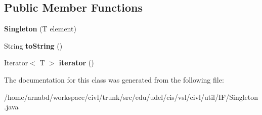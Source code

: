 \subsection*{Public Member Functions}
\begin{DoxyCompactItemize}
\item 
\hypertarget{classedu_1_1udel_1_1cis_1_1vsl_1_1civl_1_1util_1_1IF_1_1Singleton_a96b16dc1d5abe61f7f0a68994936ddb7}{}{\bfseries Singleton} (T element)\label{classedu_1_1udel_1_1cis_1_1vsl_1_1civl_1_1util_1_1IF_1_1Singleton_a96b16dc1d5abe61f7f0a68994936ddb7}

\item 
\hypertarget{classedu_1_1udel_1_1cis_1_1vsl_1_1civl_1_1util_1_1IF_1_1Singleton_ad26eefbdc586449d96727ef1938c15a4}{}String {\bfseries to\+String} ()\label{classedu_1_1udel_1_1cis_1_1vsl_1_1civl_1_1util_1_1IF_1_1Singleton_ad26eefbdc586449d96727ef1938c15a4}

\item 
\hypertarget{classedu_1_1udel_1_1cis_1_1vsl_1_1civl_1_1util_1_1IF_1_1Singleton_af7d798a946d36a30fea382ef29ba98c3}{}Iterator$<$ T $>$ {\bfseries iterator} ()\label{classedu_1_1udel_1_1cis_1_1vsl_1_1civl_1_1util_1_1IF_1_1Singleton_af7d798a946d36a30fea382ef29ba98c3}

\end{DoxyCompactItemize}


The documentation for this class was generated from the following file\+:\begin{DoxyCompactItemize}
\item 
/home/arnabd/workspace/civl/trunk/src/edu/udel/cis/vsl/civl/util/\+I\+F/Singleton.\+java\end{DoxyCompactItemize}

